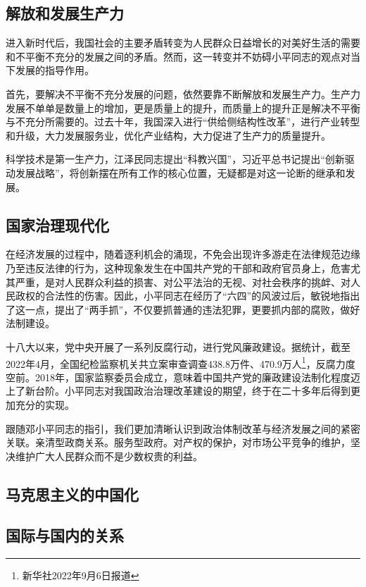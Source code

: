 \documentclass[12pt]{article}
\begin{document}
\subsection{解放和发展生产力}
进入新时代后，我国社会的主要矛盾转变为人民群众日益增长的对美好生活的需要和不平衡不充分的发展之间的矛盾。然而，这一转变并不妨碍小平同志的观点对当下发展的指导作用。

首先，要解决不平衡不充分发展的问题，依然要靠不断解放和发展生产力。生产力发展不单单是数量上的增加，更是质量上的提升，而质量上的提升正是解决不平衡与不充分所需要的。过去十年，我国深入进行“供给侧结构性改革”，进行产业转型和升级，大力发展服务业，优化产业结构，大力促进了生产力的质量提升。



科学技术是第一生产力，江泽民同志提出“科教兴国”，习近平总书记提出“创新驱动发展战略”，将创新摆在所有工作的核心位置，无疑都是对这一论断的继承和发展。

\subsection{国家治理现代化}
在经济发展的过程中，随着逐利机会的涌现，不免会出现许多游走在法律规范边缘乃至违反法律的行为，这种现象发生在中国共产党的干部和政府官员身上，危害尤其严重，是对人民群众利益的损害、对公平法治的无视、对社会秩序的挑衅、对人民政权的合法性的伤害。因此，小平同志在经历了“六四”的风波过后，敏锐地指出了这一点，提出了“两手抓”，不仅要抓普通的违法犯罪，更要抓内部的腐败，做好法制建设。

十八大以来，党中央开展了一系列反腐行动，进行党风廉政建设。据统计，截至2022年4月，全国纪检监察机关共立案审查调查438.8万件、470.9万人\footnote{新华社2022年9月6日报道}，反腐力度空前。2018年，国家监察委员会成立，意味着中国共产党的廉政建设法制化程度迈上了新台阶。小平同志对我国政治治理改革建设的期望，终于在二十多年后得到更加充分的实现。

跟随邓小平同志的指引，我们更加清晰认识到政治体制改革与经济发展之间的紧密关联。亲清型政商关系。服务型政府。对产权的保护，对市场公平竞争的维护，坚决维护广大人民群众而不是少数权贵的利益。

\subsection{马克思主义的中国化}


\subsection{国际与国内的关系}
\end{document}
